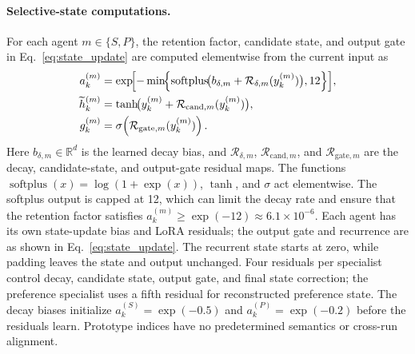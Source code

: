 ﻿\documentclass[sigconf,anonymous,review]{acmart}
\begin{document}
\paragraph{Selective-state computations.}
For each agent $m\in\{S,P\}$, the retention factor, candidate state, and output gate in Eq.~\eqref{eq:state_update} are computed elementwise from the current input as
\begin{align}
 a_k^{(m)}&=\exp\!\Bigl[-\min\!\Bigl\{
    \operatorname{softplus}\!\bigl(b_{\delta,m}+\mathcal R_{\delta,m}(y_k^{(m)})\bigr),12\Bigr\}\Bigr],\notag\\
 \widetilde h_k^{(m)}&=\tanh\!\bigl(y_k^{(m)}+\mathcal R_{\mathrm{cand},m}(y_k^{(m)})\bigr),\notag\\
 g_k^{(m)}&=\sigma\!\left(\mathcal R_{\mathrm{gate},m}(y_k^{(m)})\right).
\end{align}
Here $b_{\delta,m}\in\mathbb R^d$ is the learned decay bias, and $\mathcal R_{\delta,m}$, $\mathcal R_{\mathrm{cand},m}$, and $\mathcal R_{\mathrm{gate},m}$ are the decay, candidate-state, and output-gate residual maps. The functions $\operatorname{softplus}(x)=\log(1+\exp(x))$, $\tanh$, and $\sigma$ act elementwise. The softplus output is capped at 12, which can limit the decay rate and ensure that the retention factor satisfies $a_k^{(m)}\geq\exp(-12)\approx6.1\times10^{-6}$. Each agent has its own state-update bias and LoRA residuals; the output gate and recurrence are as shown in Eq.~\eqref{eq:state_update}. The recurrent state starts at zero, while padding leaves the state and output unchanged. Four residuals per specialist control decay, candidate state, output gate, and final state correction; the preference specialist uses a fifth residual for reconstructed preference state. The decay biases initialize $a_k^{(S)}=\exp(-0.5)$ and $a_k^{(P)}=\exp(-0.2)$ before the residuals learn. Prototype indices have no predetermined semantics or cross-run alignment.
\end{document}
